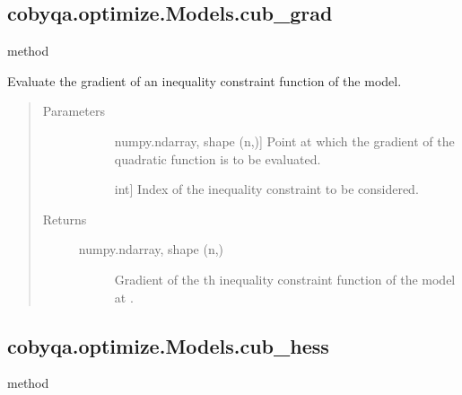 \documentclass[letterpaper,10pt,english]{sphinxmanual}
\begin{document}
\begin{fulllineitems}
\subsection{cobyqa.optimize.Models.cub\_grad}
\label{\detokenize{refs/generated/cobyqa.optimize.Models.cub_grad:cobyqa-optimize-models-cub-grad}}\label{\detokenize{refs/generated/cobyqa.optimize.Models.cub_grad::doc}}
\sphinxAtStartPar
method

\begin{fulllineitems}
\label{\detokenize{refs/generated/cobyqa.optimize.Models.cub_grad:cobyqa.optimize.Models.cub_grad}}
\sphinxAtStartPar
Evaluate the gradient of an inequality constraint function of the model.
\begin{quote}\begin{description}
\item[{Parameters}] \leavevmode\begin{description}
\item[{}] \leavevmode{[}numpy.ndarray, shape (n,){]}
\sphinxAtStartPar
Point at which the gradient of the quadratic function is to be
evaluated.

\item[{}] \leavevmode{[}int{]}
\sphinxAtStartPar
Index of the inequality constraint to be considered.

\end{description}

\item[{Returns}] \leavevmode\begin{description}
\item[{numpy.ndarray, shape (n,)}] \leavevmode
\sphinxAtStartPar
Gradient of the \sphinxhyphen{}th inequality constraint function of the model
at .

\end{description}

\end{description}\end{quote}

\end{fulllineitems}



\subsection{cobyqa.optimize.Models.cub\_hess}
\label{\detokenize{refs/generated/cobyqa.optimize.Models.cub_hess:cobyqa-optimize-models-cub-hess}}\label{\detokenize{refs/generated/cobyqa.optimize.Models.cub_hess::doc}}
\sphinxAtStartPar
method


\end{fulllineitems}
\end{document}
